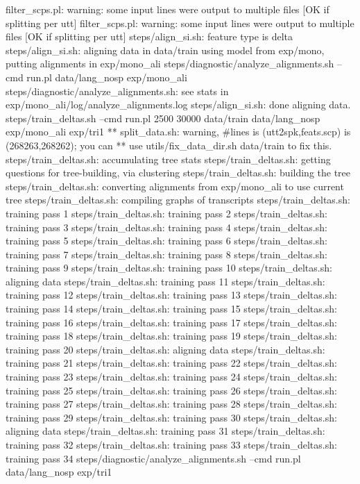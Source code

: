 filter_scps.pl: warning: some input lines were output to multiple files [OK if splitting per utt] 
filter_scps.pl: warning: some input lines were output to multiple files [OK if splitting per utt] 
steps/align_si.sh: feature type is delta
steps/align_si.sh: aligning data in data/train using model from exp/mono, putting alignments in exp/mono_ali
steps/diagnostic/analyze_alignments.sh --cmd run.pl data/lang_nosp exp/mono_ali
steps/diagnostic/analyze_alignments.sh: see stats in exp/mono_ali/log/analyze_alignments.log
steps/align_si.sh: done aligning data.
steps/train_deltas.sh --cmd run.pl 2500 30000 data/train data/lang_nosp exp/mono_ali exp/tri1
** split_data.sh: warning, #lines is (utt2spk,feats.scp) is (268263,268262); you can 
**  use utils/fix_data_dir.sh data/train to fix this.
steps/train_deltas.sh: accumulating tree stats
steps/train_deltas.sh: getting questions for tree-building, via clustering
steps/train_deltas.sh: building the tree
steps/train_deltas.sh: converting alignments from exp/mono_ali to use current tree
steps/train_deltas.sh: compiling graphs of transcripts
steps/train_deltas.sh: training pass 1
steps/train_deltas.sh: training pass 2
steps/train_deltas.sh: training pass 3
steps/train_deltas.sh: training pass 4
steps/train_deltas.sh: training pass 5
steps/train_deltas.sh: training pass 6
steps/train_deltas.sh: training pass 7
steps/train_deltas.sh: training pass 8
steps/train_deltas.sh: training pass 9
steps/train_deltas.sh: training pass 10
steps/train_deltas.sh: aligning data
steps/train_deltas.sh: training pass 11
steps/train_deltas.sh: training pass 12
steps/train_deltas.sh: training pass 13
steps/train_deltas.sh: training pass 14
steps/train_deltas.sh: training pass 15
steps/train_deltas.sh: training pass 16
steps/train_deltas.sh: training pass 17
steps/train_deltas.sh: training pass 18
steps/train_deltas.sh: training pass 19
steps/train_deltas.sh: training pass 20
steps/train_deltas.sh: aligning data
steps/train_deltas.sh: training pass 21
steps/train_deltas.sh: training pass 22
steps/train_deltas.sh: training pass 23
steps/train_deltas.sh: training pass 24
steps/train_deltas.sh: training pass 25
steps/train_deltas.sh: training pass 26
steps/train_deltas.sh: training pass 27
steps/train_deltas.sh: training pass 28
steps/train_deltas.sh: training pass 29
steps/train_deltas.sh: training pass 30
steps/train_deltas.sh: aligning data
steps/train_deltas.sh: training pass 31
steps/train_deltas.sh: training pass 32
steps/train_deltas.sh: training pass 33
steps/train_deltas.sh: training pass 34
steps/diagnostic/analyze_alignments.sh --cmd run.pl data/lang_nosp exp/tri1
